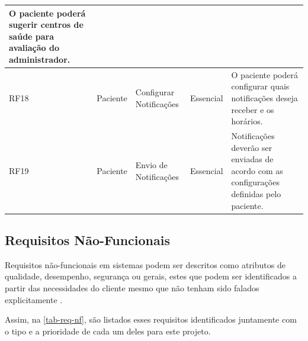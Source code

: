 \begin{table}[htb]
\begin{center}
\begin{tabular}{p{1.1cm}|p{1.3cm}|p{3.0cm}|p{1.5cm}|p{6.7cm}}
            O paciente poderá sugerir centros de saúde para avaliação do administrador.                                    \\
            \hline
            RF18            & Paciente        & Configurar Notificações         & Essencial           &
            O paciente poderá configurar quais notificações deseja receber e os horários.                                  \\
            \hline
            RF19            & Paciente        & Envio de Notificações           & Essencial           &
            Notificações deverão ser enviadas de acordo com as configurações definidas pelo paciente.                      \\
        \end{tabular}
    \end{center}
\end{table}

\newpage

\subsection{Requisitos Não-Funcionais}

Requisitos não-funcionais em sistemas podem ser descritos como atributos de qualidade, desempenho, segurança ou gerais, estes que podem
ser identificados a partir das necessidades do cliente mesmo que não tenham sido falados explicitamente \cite{pressman2014software}.

Assim, na \autoref{tab-req-nf}, são listados esses requisitos identificados juntamente com o tipo e a prioridade
de cada um deles para este projeto.

